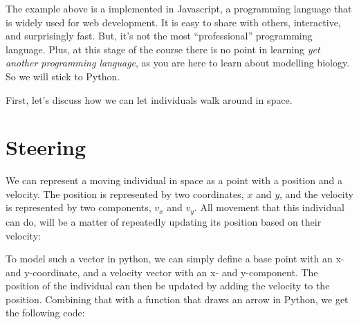 \documentclass[
  letterpaper,
  DIV=11,
  numbers=noendperiod]{scrreprt}
\theoremstyle{definition}
\theoremstyle{remark}
\begin{document}
The example above is a implemented in Javascript, a programming language
that is widely used for web development. It is easy to share with
others, interactive, and surprisingly fast. But, it's not the most
``professional'' programming language. Plus, at this stage of the course
there is no point in learning \emph{yet another programming language},
as you are here to learn about modelling biology. So we will stick to
Python.

First, let's discuss how we can let individuals walk around in space.

\section{Steering}\label{sec-steering}

We can represent a moving individual in space as a point with a position
and a velocity. The position is represented by two coordinates, \(x\)
and \(y\), and the velocity is represented by two components, \(v_x\)
and \(v_y\). All movement that this individual can do, will be a matter
of repeatedly updating its position based on their velocity:

To model such a vector in python, we can simply define a base point with
an x- and y-coordinate, and a velocity vector with an x- and
y-component. The position of the individual can then be updated by
adding the velocity to the position. Combining that with a function that
draws an arrow in Python, we get the following code:
\end{document}
